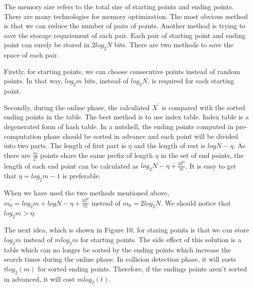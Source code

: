 \documentclass[runningheads,a4paper]{llncs}
\begin{document}
The memory size refers to the total size of starting points and ending points. There are many technologies for memory optimization. The most obvious method is that we can reduce the number of pairs of points. Another method is trying to save the storage requriement of each pair. Each pair of starting point and ending point can surely be stored in $2 log_2 N$ bits. There are two methods to save the space of each pair.

Firstly, for starting points, we can choose consecutive points instead of random points\cite{barkan2006rigorous}. In that way, $log_2 m$ bits, instead of $log_2 N$, is required for each starting point.

Secondly, during the online phase, the calculated $X^{'}$ is compared with the sorted ending points in the table. The best method is to use index table. Index table is a degenerated form of hash table. In a nutshell, the ending points computed in pre-computation phase should be sorted in advance and each point will be divided into two parts. The length of first part is $\eta$ and the length of rest is $log N  - \eta$. As there are $\frac{m}{2^\eta}$ points share the same prefix of length $\eta$ in the set of end points, the length of each end point can be calculated as $log_2 N - \eta + \frac{\eta 2^\eta}{m}$. It is easy to get that $\eta = log_2 m - 1$ is preferable. 

When we have used the two methods mentioned above, $m_0^{'} = log_2 m + log N - \eta + \frac{\eta 2^\eta}{m}$ instead of $m_0 = 2 log_2 N$. We should notice that $log_2 m > \eta$.

The next idea, which is shown in Figure 10, for staring points is that we can store $log_2 m$ instead of $m log_2 m$\cite{spitz2007time} for starting points. The side effect of this solution is a table which can no longer be sorted by the ending points which increase the search times during the online phase. In collision detection phase, it will costs $t log_2(m)$ for sorted ending points. Therefore, if the endings points aren't sorted in advanced, it will cost $m log_2(t)$. 
\end{document}
